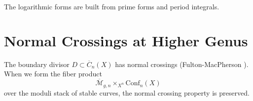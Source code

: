 The logarithmic forms are built from prime forms and period integrals.

\section{Normal Crossings at Higher Genus}
\label{sec:normal-crossings-higher-genus}

\begin{theorem}\label{thm:normal-crossings}
The boundary divisor $D \subset \overline{C}_n(X)$ has normal crossings (Fulton-MacPherson 
\cite{FM94}). When we form the fiber product
$$\overline{\mathcal{M}}_{g,n} \times_{X^n} \text{Conf}_n(X)$$
over the moduli stack of stable curves, the normal crossing property is preserved.
\end{theorem}

